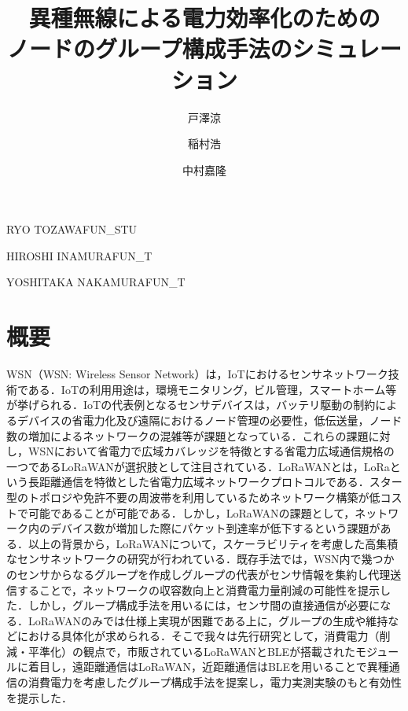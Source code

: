 \documentclass[Japanese]{dicomopapers}
\begin{document}
\title{異種無線による電力効率化のための\\ノードのグループ構成手法のシミュレーション}



\author{戸澤涼}{RYO TOZAWA}{FUN_STU}
\author{稲村浩}{HIROSHI INAMURA}{FUN_T}
\author{中村嘉隆}{YOSHITAKA NAKAMURA}{FUN_T}


\maketitle

\section{概要}
WSN（WSN: Wireless Sensor Network）は，IoTにおけるセンサネットワーク技術である．IoTの利用用途は，環境モニタリング，ビル管理，スマートホーム等が挙げられる．IoTの代表例となるセンサデバイスは，バッテリ駆動の制約によるデバイスの省電力化及び遠隔におけるノード管理の必要性，低伝送量，ノード数の増加によるネットワークの混雑等が課題となっている．これらの課題に対し，WSNにおいて省電力で広域カバレッジを特徴とする省電力広域通信規格の一つであるLoRaWANが選択肢として注目されている．LoRaWANとは，LoRaという長距離通信を特徴とした省電力広域ネットワークプロトコルである．スター型のトポロジや免許不要の周波帯を利用しているためネットワーク構築が低コストで可能であることが可能である．しかし，LoRaWANの課題として，ネットワーク内のデバイス数が増加した際にパケット到達率が低下するという課題がある．以上の背景から，LoRaWANについて，スケーラビリティを考慮した高集積なセンサネットワークの研究が行われている．既存手法では，WSN内で幾つかのセンサからなるグループを作成しグループの代表がセンサ情報を集約し代理送信することで，ネットワークの収容数向上と消費電力量削減の可能性を提示した．しかし，グループ構成手法を用いるには，センサ間の直接通信が必要になる．LoRaWANのみでは仕様上実現が困難である上に，グループの生成や維持などにおける具体化が求められる．そこで我々は先行研究\cite{me_research}として，消費電力（削減・平準化）の観点で，市販されているLoRaWANとBLEが搭載されたモジュールに着目し，遠距離通信はLoRaWAN，近距離通信はBLEを用いることで異種通信の消費電力を考慮したグループ構成手法を提案し，電力実測実験のもと有効性を提示した．
\end{document}

